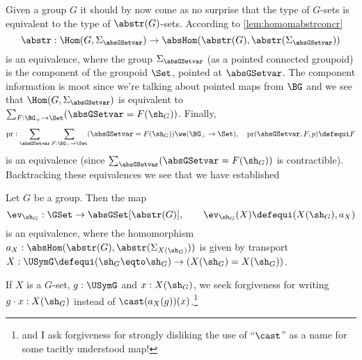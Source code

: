 Given a group $G$ it should by now come as no surprise that the type of $G$-sets is equivalent to the type of $\abstr(G)$-sets.
According to \cref{lem:homomabstrconcr}
$$\abstr:\Hom(G,\Sigma_{\absGSetvar})\to\absHom(\abstr(G),\abstr(\Sigma_{\absGSetvar}))$$
is an equivalence, where the group $\Sigma_{\absGSetvar}$ (as a pointed connected groupoid) is the component of the groupoid $\Set$, pointed at $\absGSetvar$.  The component information is moot since we're talking about pointed maps from $\BG$ and we see that $\Hom(G,\Sigma_{\absGSetvar})$ is equivalent to $\sum_{F:\BG_\div\to\Set}(\absGSetvar=F(\sh_G))$.  Finally,
$$\mathrm{pr}:\sum_{\absGSetvar}\sum_{F:\BG_\div\to\Set}(\absGSetvar=F(\sh_G))\we
(\BG_\div\to\Set),\quad \mathrm{pr}(\absGSetvar,F,p)\defequi F
$$
is an equivalence (since $\sum_{\absGSetvar}(\absGSetvar=F(\sh_G))$ is contractible).
Backtracking these equivalences we see that we have established
\begin{lemma}
  \label{lem:actionsconcreteandabstract}
  Let $G$ be a group.  Then the map
  $$\ev_{\sh_G}:\GSet\to\absGSet[\abstr(G)],\qquad \ev_{\sh_G}(X)\defequi(X(\sh_G),a_X)
$$
is an equivalence, where the homomorphism $a_X:\absHom(\abstr(G), \abstr(\Sigma_{X(\sh_G)}))$ is given by transport $X:\USymG\defequi(\sh_G\eqto \sh_G)\to (X(\sh_G)=X(\sh_G))$.
\end{lemma}
If $X$ is a $G$-set, $g:\USymG$ and $x:X(\sh_G)$, we seek forgiveness for writing $g\cdot x:X(\sh_G)$ instead of $\cast(a_X(g))(x)$.\footnote{and I ask forgiveness for strongly disliking the use of ``$\cast$'' as a name for some tacitly understood map!}


